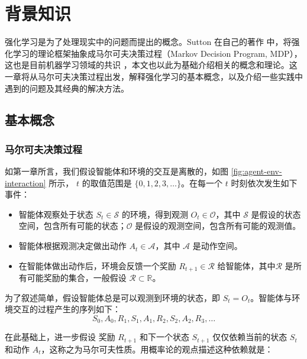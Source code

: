 
\chapter{背景知识}
\label{cha:background-knowledge}

强化学习是为了处理现实中的问题而提出的概念。Sutton 在自己的著作 \cite{suttonReinforcementLearningIntroduction2018}中，将强化学习的理论框架抽象成马尔可夫决策过程（Markov Decision Program, MDP），这也是目前机器学习领域的共识 \cite{mnihHumanlevelControlDeep2015} \cite{mnihAsynchronousMethodsDeep2016} \cite{hesselRainbowCombiningImprovements2018}  ，本文也以此为基础介绍相关的概念和理论。这一章将从马尔可夫决策过程出发，解释强化学习的基本概念，以及介绍一些实践中遇到的问题及其经典的解决方法。

\section{基本概念}
\subsection{马尔可夫决策过程}

如第一章所言，我们假设智能体和环境的交互是离散的，如图 \ref{fig:agent-env-interaction} 所示， $t$ 的取值范围是 $\{0, 1, 2,3, \dots\}$。在每一个 $t$ 时刻依次发生如下事件：
\begin{itemize}
    \item 智能体观察处于状态 $S_t \in \mathcal{S}$ 的环境，得到观测 $O_t \in \mathcal{O}$，其中 $\mathcal{S}$ 是假设的状态空间，包含所有可能的状态；$\mathcal{O}$ 是假设的观测空间，包含所有可能的观测值。
    \item 智能体根据观测决定做出动作 $A_t \in \mathcal{A}$，其中 $\mathcal{A}$ 是动作空间。
    \item 在智能体做出动作后，环境会反馈一个奖励 $R_{t+1} \in \mathcal{R}$ 给智能体，其中$\mathcal{R}$ 是所有可能奖励的集合，一般假设 $\mathcal{R} \subset \mathbb{R}$。
\end{itemize}

为了叙述简单，假设智能体总是可以观测到环境的状态，即 $S_t = O_t$。智能体与环境交互的过程产生的序列如下：
\begin{equation}
    S_0, A_0, R_1, S_1, A_1, R_2, S_2, A_2, R_3,\dots
    \label{eq:mdp-sequence}
\end{equation}

在此基础上，进一步假设 奖励 $R_{t+1}$ 和下一个状态 $S_{t+1}$ 仅仅依赖当前的状态 $S_t$ 和动作 $A_t$，这称之为马尔可夫性质。用概率论的观点描述这种依赖就是：

